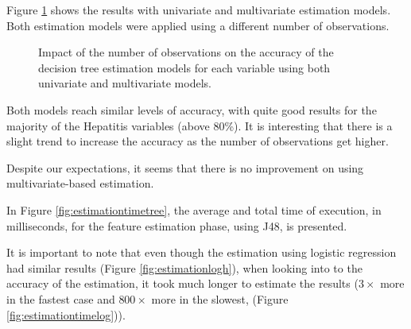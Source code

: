 Figure \ref{fig:estimationtreeh} shows the results with univariate and multivariate estimation models. Both estimation models were
 applied using a different number of observations. 
 
\begin{figure}[h]
  \begin{subfigmatrix}{2}
  \end{subfigmatrix}
  \caption{Impact of the number of observations on the accuracy of the decision tree estimation models for each variable using both univariate and multivariate models.}
  \label{fig:estimationtreeh}
\end{figure}
 
Both models reach similar levels of accuracy, with quite good results for the majority of the Hepatitis variables
 (above 80\%). It is interesting that there is a slight trend to increase the accuracy as the number of observations get higher.

Despite our expectations, it seems that there is no improvement on using multivariate-based estimation.

In Figure \ref{fig:estimationtimetree}, the average and total time of execution, in milliseconds, for the feature estimation phase, using J48, is presented. 

It is important to note that even though the estimation using logistic regression had similar results (Figure \ref{fig:estimationlogh}),
 when looking into to the accuracy of the estimation, it took much longer to estimate the results
 ($3\times$ more in the fastest case and $800\times$ more in the slowest, (Figure \ref{fig:estimationtimelog})).

